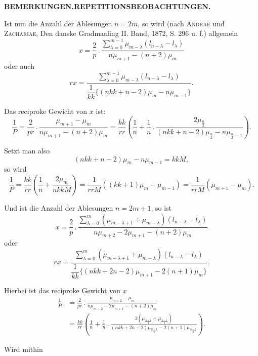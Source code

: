 \par\clearpage
\noindent\null\hfill{\small\textbf{BEMERKUNGEN.\quad REPETITIONSBEOBACHTUNGEN.}}\hfill{}\par\medskip
\begingroup\small
\par\noindent\hspace*{\parindent}Ist nun die Anzahl der Ablesungen $n=2m$, so wird (nach \textsc{Andrae} und \textsc{Zachariae}, Den danske Gradmaaling II. Band, 1872, S. 296 u. f.) allgemein
\[
x=\frac2p\,.\,\frac{\displaystyle\sum_{\lambda=0}^{m-1}\mu_{m-\lambda}(l_{n-\lambda}-l_\lambda)}{n\mu_{m+1}-(n+2)\mu_m}
\]
\noindent oder auch
\[
rx=\frac{\displaystyle\sum_{\lambda=0}^{m-1}\mu_{m-\lambda}(l_{n-\lambda}-l_\lambda)}{\dfrac1{kk}\{(nkk+n-2)\mu_m-n\mu_{m-1}\}}.
\]
\par\noindent\hspace*{\parindent}Das reciproke Gewicht von $x$ ist:
\[
\frac1P=\frac2{pr}\,.\,\frac{\mu_{m+1}-\mu_m}{n\mu_{m+1}-(n+2)\mu_m}
=\frac{kk}{rr}\left(\frac1n+\frac1n\,.\,\frac{2\mu_{\frac n2}}{(nkk+n-2)\mu_{\frac n2}-n\mu_{\frac n2-1}}\right).
\]
\par\noindent\hspace*{\parindent}Setzt man also
\[
(nkk+n-2)\mu_m-n\mu_{m-1}=kkM,
\]
\noindent so wird
\[
\frac1P=\frac{kk}{rr}\left(\frac1n+\frac{2\mu_m}{nkkM}\right)
=\frac1{rrM}((kk+1)\mu_m-\mu_{m-1})=\frac1{rrM}(\mu_{m+1}-\mu_m).
\]
\par\noindent\hspace*{\parindent}Und ist die Anzahl der Ablesungen $n=2m+1$, so ist
\[
x=\frac2p\,.\,\frac{\displaystyle\sum_{\lambda=0}^{m}(\mu_{m-\lambda+1}+\mu_{m-\lambda})(l_{n-\lambda}-l_\lambda)}{n\mu_{m+2}-2\mu_{m+1}-(n+2)\mu_m}
\]
\noindent oder
\[
rx=\frac{\displaystyle\sum_{\lambda=0}^{m}(\mu_{m-\lambda+1}+\mu_{m-\lambda})(l_{n-\lambda}-l_\lambda)}{\dfrac1{kk}\{(nkk+2n-2)\mu_{m+1}-2(n+1)\mu_m\}}.
\]
\par\noindent\hspace*{\parindent}Hierbei ist das reciproke Gewicht von $x$
\[
\begin{aligned}
\frac1P&=\frac2{pr}\,.\,\frac{\mu_{m+2}-\mu_m}{n\mu_{m+2}-2\mu_{m+1}-(n+2)\mu_m}\\
&=\frac{kk}{rr}\left(\frac1n+\frac1n\,.\,\frac{2(\mu_{\frac{n+1}2}+\mu_{\frac{n-1}2})}{(nkk+2n-2)\mu_{\frac{n+1}2}-2(n+1)\mu_{\frac{n-1}2}}\right).
\end{aligned}
\]
\par\noindent\hspace*{\parindent}Wird mithin
